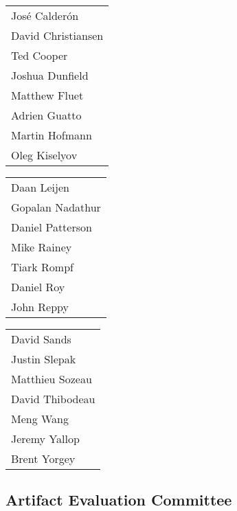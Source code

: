 \begin{tabular}[t]{@{}p{\namewidth}}
José Calderón\\
David Christiansen\\
Ted Cooper\\
Joshua Dunfield\\
Matthew Fluet\\
Adrien Guatto \\
Martin Hofmann\\
Oleg Kiselyov\\
\end{tabular}%
\begin{tabular}[t]{p{\namewidth}}
Daan Leijen\\
Gopalan Nadathur\\
Daniel Patterson\\
Mike Rainey\\
Tiark Rompf\\
Daniel Roy\\
John Reppy\\
\end{tabular}%
\begin{tabular}[t]{p{\namewidth}}
David Sands\\
Justin Slepak\\
Matthieu Sozeau\\
David Thibodeau\\
Meng Wang\\
Jeremy Yallop\\
Brent Yorgey
\end{tabular}

\subsection*{\sffamily Artifact Evaluation Committee}

